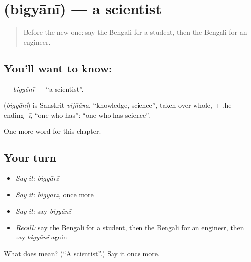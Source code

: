 \section[\texorpdfstring{\bn{বিজ্ঞানী} (bigyānī)}{বিজ্ঞানী (bigyānī)}]{ (bigyānī) — a scientist}

\label{lesson:BN-C177-bigyani}



\begin{quote}
Before the new one: say the Bengali for a student, then the Bengali for an engineer.
\end{quote}

\subsection*{You'll want to know: }
\textbf{} — \emph{bigyānī} — \textquotedblleft{}a scientist\textquotedblright{}.

\begin{cousinweb}
\textbf{} (\emph{bigyānī}) is Sanskrit \emph{vijñāna}, \textquotedblleft{}knowledge, science\textquotedblright{}, taken over whole, + the ending \emph{-ī}, \textquotedblleft{}one who has\textquotedblright{}: \textquotedblleft{}one who has science\textquotedblright{}.
\end{cousinweb}

\begin{grammarlens}[title={What you've built}]
One more word for this chapter.
\end{grammarlens}

\subsection*{Your turn}
\begin{itemize}
\raggedright
  \item \emph{Say it:} \emph{bigyānī}
  \item \emph{Say it:} \emph{bigyānī}, once more
  \item \emph{Say it:} say \emph{bigyānī}
  \item \emph{Recall:} say the Bengali for a student, then the Bengali for an engineer, then say \emph{bigyānī} again
\end{itemize}

\begin{tcolorbox}[breakable,colback=teal!4,colframe=teal!35!black,title={Before you move on}]
What does  mean? (\textquotedblleft{}A scientist\textquotedblright{}.) Say it once more.
\end{tcolorbox}
